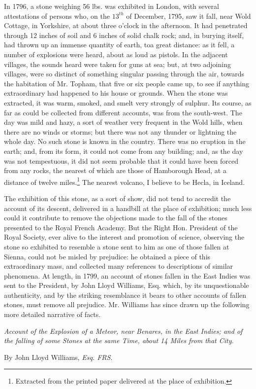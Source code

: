 \documentclass[a4paper, 12pt, oneside, twocolumn]{article}
\begin{document}
In 1796, a stone weighing 56 lbs. was exhibited in London, with several attestations of persons who, on the $13^{th}$ of December, 1795, saw it fall, near Wold Cottage, in Yorkshire, at about three o'clock in the afternoon. It had penetrated through 12 inches of soil and 6 inches of solid chalk rock; and, in burying itself, had thrown up an immense quantity of earth, toa great distance: as it fell, a number of explosions were heard, about as loud as pistols. In the adjacent villages, the sounds heard were taken for guns at sea; but, at two adjoining villages, were so distinct of something singular passing through the air, towards the habitation of Mr. Topham, that five or six people came up, to see if anything extraordinary had happened to his house or grounds. When the stone was extracted, it was warm, smoked, and smelt very strongly of sulphur. Its course, as far as could be collected from different accounts, was from the south-west. The day was mild and hazy, a sort of weather very frequent in the Wold hills, when there are no winds or storms; but there was not any thunder or lightning the whole day. No such stone is known in the country. There was no eruption in the earth; and, from its form, it could not come from any building; and, as the day was not tempestuous, it did not seem probable that it could have been forced from any rocks, the nearest of which are those of Hamborough Head, at a distance of twelve miles.\footnote{Extracted from the printed paper delivered at the place of exhibition.} The nearest volcano, I believe to be Hecla, in Iceland.

The exhibition of this stone, as a sort of show, did not tend to accredit the account of its descent, delivered in a handbill at the place of exhibition; much less could it contribute to remove the objections made to the fall of the stones presented to the Royal French Academy. But the Right Hon. President of the Royal Society, ever alive to the interest and promotion of science, observing the stone so exhibited to resemble a stone sent to him as one of those fallen at Sienna, could not be misled by prejudice: he obtained a piece of this extraordinary mass, and collected many references to descriptions of similar phenomena. At length, in 1799, an account of stones fallen in the East Indies was sent to the President, by John Lloyd Williams, Esq. which, by its unquestionable authenticity, and by the striking resemblance it bears to other accounts of fallen stones, must remove all prejudice. Mr. Williams has since drawn up the following more detailed narrative of facts.
\begin{center}
\emph{Account of the Explosion of a Meteor, near Benares, in the East Indies; and of the falling of some Stones at the same Time, about 14 Miles from that City.}
\end{center}
\begin{center}
By John Lloyd Williams, \emph{Esq. FRS.}
\end{center}
\end{document}
